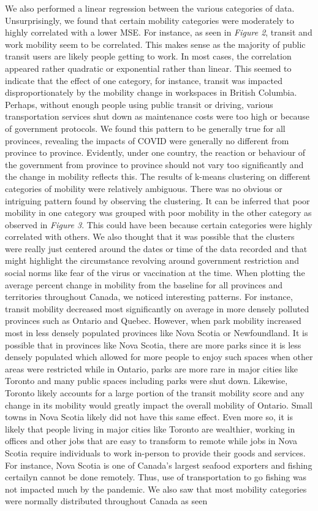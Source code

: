 \documentclass[fontsize=11pt]{article}
\begin{document}
    \newpage
    We also performed a linear regression between the various categories of data. Unsurprisingly, we found that certain mobility categories were moderately to highly correlated with a lower MSE. For instance, as seen in \emph{Figure 2}, transit and work mobility seem to be correlated. This makes sense as the majority of public transit users are likely people getting to work. In most cases, the correlation appeared rather quadratic or exponential rather than linear. This seemed to indicate that the effect of one category, for instance, transit was impacted disproportionately by the mobility change in workspaces in British Columbia. Perhaps, without enough people using public transit or driving, various transportation services shut down as maintenance costs were too high or because of government protocols. We found this pattern to be generally true for all provinces, revealing the impacts of COVID were generally no different from province to province. Evidently, under one country, the reaction or behaviour of the government from province to province should not vary too significantly and the change in mobility reflects this. The results of k-means clustering on different categories of mobility were relatively ambiguous. There was no obvious or intriguing pattern found by observing the clustering. It can be inferred that poor mobility in one category was grouped with poor mobility in the other category as observed in \emph{Figure 3}. This could have been because certain categories were highly correlated with others. We also thought that it was possible that the clusters were really just centered around the dates or time of the data recorded and that might highlight the circumstance revolving around government restriction and social norms like fear of the virus or vaccination at the time. When plotting the average percent change in mobility from the baseline for all provinces and territories throughout Canada, we noticed interesting patterns. For instance, transit mobility decreased most significantly on average in more densely polluted provinces such as Ontario and Quebec. However, when park mobility increased most in less densely populated provinces like Nova Scotia or Newfoundland. It is possible that in provinces like Nova Scotia, there are more parks since it is less densely populated which allowed for more people to enjoy such spaces when other areas were restricted while in Ontario, parks are more rare in major cities like Toronto and many public spaces including parks were shut down. Likewise, Toronto likely accounts for a large portion of the transit mobility score and any change in its mobility would greatly impact the overall mobility of Ontario. Small towns in Nova Scotia likely did not have this same effect. Even more so, it is likely that people living in major cities like Toronto are wealthier, working in offices and other jobs that are easy to transform to remote while jobs in Nova Scotia require individuals to work in-person to provide their goods and services. For instance, Nova Scotia is one of Canada's largest seafood exporters and fishing certailyn cannot be done remotely. Thus, use of transportation to go fishing was not impacted much by the pandemic. We also saw that most mobility categories were normally distributed throughout Canada as seen 
\end{document}

